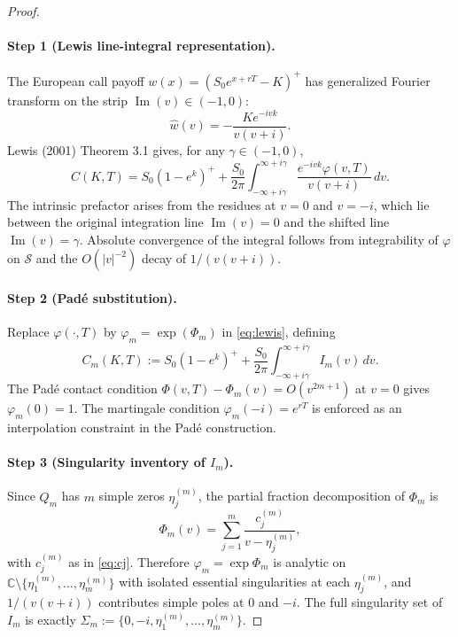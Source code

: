 \documentclass{article}
\newcommand{\C}{\mathbb{C}}
\newcommand{\cS}{\mathcal{S}}
\begin{document}
\begin{proof}

\paragraph{Step 1 (Lewis line-integral representation).}
The European call payoff $w(x) = (S_0 e^{x+rT} - K)^+$ has
generalized Fourier transform on the strip $\operatorname{Im}(v)\in(-1,0)$:
\begin{equation}\label{eq:payoff_ft}
  \widehat{w}(v) = -\frac{K e^{-ivk}}{v(v+i)}.
\end{equation}
Lewis (2001) Theorem 3.1 gives, for any $\gamma\in(-1,0)$,
\begin{equation}\label{eq:lewis}
  C(K,T) = S_0(1-e^k)^+
    + \frac{S_0}{2\pi}\int_{-\infty+i\gamma}^{\infty+i\gamma}
      \frac{e^{-ivk}\varphi(v,T)}{v(v+i)}\,dv.\tag{1}
\end{equation}
The intrinsic prefactor arises from the residues at $v=0$ and
$v=-i$, which lie between the original integration line
$\operatorname{Im}(v)=0$ and the shifted line $\operatorname{Im}(v)=\gamma$.
Absolute convergence of the integral follows from integrability of
$\varphi$ on $\cS$ and the $O(|v|^{-2})$ decay of $1/(v(v+i))$.

\paragraph{Step 2 (Pad\'e substitution).}
Replace $\varphi(\cdot,T)$ by $\varphi_m = \exp(\Phi_m)$ in \eqref{eq:lewis},
defining
\begin{equation}\label{eq:Cm_def}
  C_m(K,T) := S_0(1-e^k)^+
    + \frac{S_0}{2\pi}\int_{-\infty+i\gamma}^{\infty+i\gamma}
      I_m(v)\,dv.\tag{2}
\end{equation}
The Pad\'e contact condition $\Phi(v,T) - \Phi_m(v) = O(v^{2m+1})$
at $v=0$ gives $\varphi_m(0) = 1$.  The martingale condition
$\varphi_m(-i) = e^{rT}$ is enforced as an interpolation constraint
in the Pad\'e construction.

\paragraph{Step 3 (Singularity inventory of $I_m$).}
Since $Q_m$ has $m$ simple zeros $\eta_j^{(m)}$, the partial fraction
decomposition of $\Phi_m$ is
\begin{equation}\label{eq:pf}
  \Phi_m(v) = \sum_{j=1}^m \frac{c_j^{(m)}}{v - \eta_j^{(m)}},\tag{3}
\end{equation}
with $c_j^{(m)}$ as in \eqref{eq:cj}.
Therefore $\varphi_m = \exp\Phi_m$ is analytic on
$\C\setminus\{\eta_1^{(m)},\dots,\eta_m^{(m)}\}$ with isolated
essential singularities at each $\eta_j^{(m)}$, and $1/(v(v+i))$
contributes simple poles at $0$ and $-i$.  The full singularity set
of $I_m$ is exactly
$\Sigma_m := \{0,-i,\eta_1^{(m)},\dots,\eta_m^{(m)}\}$.


\end{proof}
\end{document}
